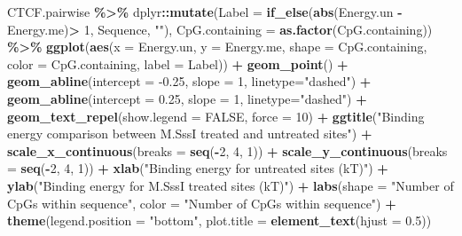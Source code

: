 \documentclass[
]{article}
\newenvironment{Shaded}{\begin{snugshade}}{\end{snugshade}}
\newcommand{\DataTypeTok}[1]{\textcolor[rgb]{0.13,0.29,0.53}{#1}}
\newcommand{\DecValTok}[1]{\textcolor[rgb]{0.00,0.00,0.81}{#1}}
\newcommand{\FloatTok}[1]{\textcolor[rgb]{0.00,0.00,0.81}{#1}}
\newcommand{\KeywordTok}[1]{\textcolor[rgb]{0.13,0.29,0.53}{\textbf{#1}}}
\newcommand{\NormalTok}[1]{#1}
\newcommand{\OperatorTok}[1]{\textcolor[rgb]{0.81,0.36,0.00}{\textbf{#1}}}
\newcommand{\OtherTok}[1]{\textcolor[rgb]{0.56,0.35,0.01}{#1}}
\newcommand{\StringTok}[1]{\textcolor[rgb]{0.31,0.60,0.02}{#1}}
\begin{document}
\begin{Shaded}
\begin{Highlighting}[]
\NormalTok{CTCF.pairwise }\OperatorTok{\%\textgreater{}\%}
\StringTok{  }\NormalTok{dplyr}\OperatorTok{::}\KeywordTok{mutate}\NormalTok{(}\DataTypeTok{Label =} \KeywordTok{if\_else}\NormalTok{(}\KeywordTok{abs}\NormalTok{(Energy.un }\OperatorTok{{-}}\StringTok{ }\NormalTok{Energy.me)}\OperatorTok{\textgreater{}}\StringTok{ }\DecValTok{1}\NormalTok{, Sequence, }\StringTok{""}\NormalTok{), }
                \DataTypeTok{CpG.containing =} \KeywordTok{as.factor}\NormalTok{(CpG.containing)) }\OperatorTok{\%\textgreater{}\%}
\StringTok{  }\KeywordTok{ggplot}\NormalTok{(}\KeywordTok{aes}\NormalTok{(}\DataTypeTok{x =}\NormalTok{ Energy.un, }\DataTypeTok{y =}\NormalTok{ Energy.me, }\DataTypeTok{shape =}\NormalTok{ CpG.containing, }\DataTypeTok{color =}\NormalTok{ CpG.containing, }\DataTypeTok{label =}\NormalTok{ Label)) }\OperatorTok{+}
\StringTok{  }\KeywordTok{geom\_point}\NormalTok{() }\OperatorTok{+}
\StringTok{  }\KeywordTok{geom\_abline}\NormalTok{(}\DataTypeTok{intercept =} \FloatTok{{-}0.25}\NormalTok{, }\DataTypeTok{slope =} \DecValTok{1}\NormalTok{, }\DataTypeTok{linetype=}\StringTok{"dashed"}\NormalTok{) }\OperatorTok{+}
\StringTok{  }\KeywordTok{geom\_abline}\NormalTok{(}\DataTypeTok{intercept =} \FloatTok{0.25}\NormalTok{, }\DataTypeTok{slope =} \DecValTok{1}\NormalTok{, }\DataTypeTok{linetype=}\StringTok{"dashed"}\NormalTok{) }\OperatorTok{+}
\StringTok{  }\KeywordTok{geom\_text\_repel}\NormalTok{(}\DataTypeTok{show.legend =} \OtherTok{FALSE}\NormalTok{, }\DataTypeTok{force =} \DecValTok{10}\NormalTok{) }\OperatorTok{+}
\StringTok{  }\KeywordTok{ggtitle}\NormalTok{(}\StringTok{"Binding energy comparison between M.SssI treated and untreated sites"}\NormalTok{) }\OperatorTok{+}
\StringTok{  }\KeywordTok{scale\_x\_continuous}\NormalTok{(}\DataTypeTok{breaks =} \KeywordTok{seq}\NormalTok{(}\OperatorTok{{-}}\DecValTok{2}\NormalTok{, }\DecValTok{4}\NormalTok{, }\DecValTok{1}\NormalTok{)) }\OperatorTok{+}\StringTok{ }\KeywordTok{scale\_y\_continuous}\NormalTok{(}\DataTypeTok{breaks =} \KeywordTok{seq}\NormalTok{(}\OperatorTok{{-}}\DecValTok{2}\NormalTok{, }\DecValTok{4}\NormalTok{, }\DecValTok{1}\NormalTok{)) }\OperatorTok{+}
\StringTok{  }\KeywordTok{xlab}\NormalTok{(}\StringTok{"Binding energy for untreated sites (kT)"}\NormalTok{) }\OperatorTok{+}
\StringTok{  }\KeywordTok{ylab}\NormalTok{(}\StringTok{"Binding energy for M.SssI treated sites (kT)"}\NormalTok{) }\OperatorTok{+}
\StringTok{  }\KeywordTok{labs}\NormalTok{(}\DataTypeTok{shape =} \StringTok{"Number of CpGs within sequence"}\NormalTok{, }\DataTypeTok{color =} \StringTok{"Number of CpGs within sequence"}\NormalTok{) }\OperatorTok{+}
\StringTok{  }\KeywordTok{theme}\NormalTok{(}\DataTypeTok{legend.position =} \StringTok{"bottom"}\NormalTok{, }\DataTypeTok{plot.title =} \KeywordTok{element\_text}\NormalTok{(}\DataTypeTok{hjust =} \FloatTok{0.5}\NormalTok{))}
\end{Highlighting}
\end{Shaded}
\end{document}

